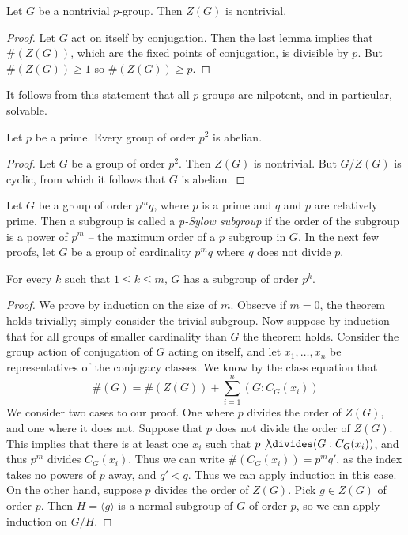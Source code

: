 \begin{lemma}
    Let $G$ be a nontrivial $p$-group. Then $Z(G)$ is nontrivial.
\end{lemma}
\begin{proof}
    Let $G$ act on itself by conjugation. Then the last lemma implies that $\#(Z(G))$, which are the fixed points of conjugation, is divisible by $p$. But $\#(Z(G)) \geq 1$ so $\#(Z(G)) \geq p$.
\end{proof}

\begin{remark}
    It follows from this statement that all $p$-groups are nilpotent, and in particular, solvable.
\end{remark}

\begin{corollary}
    Let $p$ be a prime. Every group of order $p^2$ is abelian.
\end{corollary}
\begin{proof}
    Let $G$ be a group of order $p^2$. Then $Z(G)$ is nontrivial. But $G/Z(G)$ is cyclic, from which it follows that $G$ is abelian.
\end{proof}

Let $G$ be a group of order $p^mq$, where $p$ is a prime and $q$ and $p$ are relatively prime. Then a subgroup is called a \emph{p-Sylow subgroup}  if the order of the subgroup is a power of $p^m$ -- the maximum order of a $p$ subgroup in $G$. In the next few proofs, let $G$ be a group of cardinality $p^mq$ where $q$ does not divide $p$.

\begin{lemma}
    For every $k$ such that $1 \leq k \leq m$, $G$ has a subgroup of order $p^k$.
\end{lemma}
\begin{proof}
    We prove by induction on the size of $m$. Observe if $m = 0$, the theorem holds trivially; simply consider the trivial subgroup. Now suppose by induction that for all groups of smaller cardinality than $G$ the theorem holds. Consider the group action of conjugation of $G$ acting on itself, and let $x_1,\dots, x_n$ be representatives of the conjugacy classes. We know by the class equation that
    \[ \#(G) = \#(Z(G)) + \sum_{i = 1}^n (G:C_G(x_i)) \]
    We consider two cases to our proof. One where $p$ divides the order of $Z(G)$, and one where it does not. Suppose that $p$ does not divide the order of $Z(G)$. This implies that there is at least one $x_i$ such that $p \not \divides (G:C_G(x_i))$, and thus $p^m$ divides $C_G(x_i)$. Thus we can write $\#(C_G(x_i)) = p^mq'$, as the index takes no powers of $p$ away, and $q' < q$. Thus we can apply induction in this case. On the other hand, suppose $p$ divides the order of $Z(G)$. Pick $g \in Z(G)$ of order $p$. Then $H = \langle g \rangle$ is a normal subgroup of $G$ of order $p$, so we can apply induction on $G/H$.
\end{proof}

